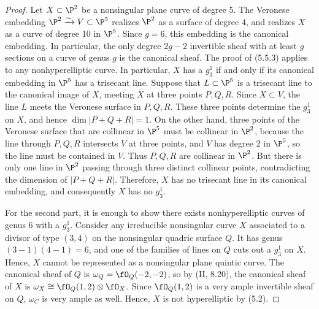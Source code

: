 \documentclass[a4paper]{article}
\begin{document}
\begin{enumerate} [label=\textbf{\arabic*.}, leftmargin=0em]
        \begin{proof}
          Let $X \subset \P^2$ be a nonsingular plane curve of degree 5.
          The Veronese embedding $\P^2 \xrightarrow{\sim} V \subset \P^5$
          realizes $\P^2$ as a surface of degree 4, and realizes $X$ as a curve of degree 10 in $\P^5$.
          Since $g = 6$, this embedding is the canonical embedding.
          In particular, the only degree $2g - 2$ invertible sheaf with at least $g$ sections on a curve of genus $g$ is the canonical sheaf.
          The proof of (5.5.3) applies to any nonhyperelliptic curve. In particular, $X$ has a $g^1_3$ if and only if its canonical embedding in $\P^5$ has a trisecant line.
          Suppose that $L \subset\P^5$ is a trisecant line to the canonical image of $X$, meeting $X$ at three points $P, Q, R$.
          Since $X \subset V$, the line $L$ meets the Veronese surface in $P,Q,R$.
          These three points determine the $g^1_3$ on $X$, and hence $\dim |P + Q + R| = 1$.
          On the other hand, three points of the Veronese surface that are collinear in $\P^5$ must be collinear in $\P^2$, because the line through $P, Q, R$ intersects $V$ at three points, and $V$ has degree 2 in $\P^5$, so the line must be contained in $V$.
          Thus $P,Q,R$ are collinear in $\P^2$.
          But there is only one line in $\P^2$ passing through three distinct collinear points, contradicting the dimension of $|P + Q + R|$.
          Therefore, $X$ has no trisecant line in its canonical embedding, and consequently $X$ has no $g^1_3$.

          For the second part, it is enough to show there exists nonhyperelliptic curves of genus 6 with a $g_3^1$.
          Consider any irreducible nonsingular curve $X$ associated to a divisor of type $(3, 4)$ on the nonsingular quadric surface $Q$.
          It has genus $(3 - 1)(4 - 1) = 6$, and one of the families of lines on $Q$ cuts out a $g_3^1$ on $X$.
          Hence, $X$ cannot be represented as a nonsingular plane quintic curve.
          The canonical sheaf of $Q$ is $\omega_Q = \fO_Q(-2, -2)$, so by (II, 8.20), the canonical sheaf of $X$ is $\omega_X \cong \fO_Q(1, 2) \otimes \fO_X$.
          Since $\fO_Q(1, 2)$ is a very ample invertible sheaf on $Q$, $\omega_C$ is very ample as well.
          Hence, $X$ is not hyperelliptic by (5.2).
        \end{proof}


\end{enumerate}
\end{document}
